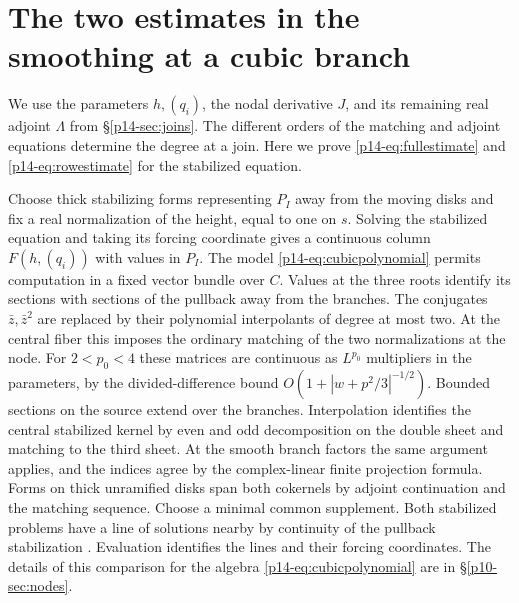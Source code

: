 \section{The two estimates in the smoothing at a cubic branch}\label{app:joined-estimates}
We use the parameters $h,(q_i)$, the nodal derivative $J$, and its
remaining real adjoint $\Lambda$ from \S\ref{p14-sec:joins}.
The different orders of the matching and adjoint equations determine
the degree at a join. Here we prove \eqref{p14-eq:fullestimate}
and \eqref{p14-eq:rowestimate} for the stabilized equation.

Choose thick stabilizing forms representing $P_I$ away from the
moving disks and fix a real normalization of the height, equal to one
on $s$. Solving the stabilized equation and taking its forcing
coordinate gives a continuous column $F(h,(q_i))$ with values in
$P_I$. The model \eqref{p14-eq:cubicpolynomial} permits computation in
a fixed vector bundle over $C$. Values at the three roots identify
its sections with sections of the pullback away from the branches.
The conjugates $\bar z,\bar z^2$ are replaced by their polynomial
interpolants of degree at most two. At the central fiber this imposes
the ordinary matching of the two normalizations at the node. For
$2<p_0<4$ these matrices are continuous as $L^{p_0}$ multipliers
in the parameters, by the divided-difference bound
$O(1+|w+p^2/3|^{-1/2})$. Bounded sections on the source extend over
the branches. Interpolation identifies the central stabilized kernel
by even and odd decomposition on the double sheet and matching
to the third sheet. At the smooth branch factors the same argument
applies, and the indices agree by the complex-linear finite projection formula.
Forms on thick unramified disks span both cokernels by adjoint
continuation and the matching sequence. Choose a minimal common
supplement. Both stabilized problems have a line of solutions nearby
by continuity of the pullback stabilization \cite[Appendix~B]{bai}.
Evaluation identifies the lines and their forcing coordinates.
The details of this comparison for the algebra \eqref{p14-eq:cubicpolynomial} are in \S\ref{p10-sec:nodes}.


